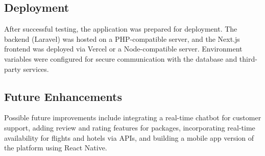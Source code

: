 \subsection{Deployment}
After successful testing, the application was prepared for deployment. The backend (Laravel) was hosted on a PHP-compatible server, and the Next.js frontend was deployed via Vercel or a Node-compatible server. Environment variables were configured for secure communication with the database and third-party services.

\subsection{Future Enhancements}
Possible future improvements include integrating a real-time chatbot for customer support, adding review and rating features for packages, incorporating real-time availability for flights and hotels via APIs, and building a mobile app version of the platform using React Native.
